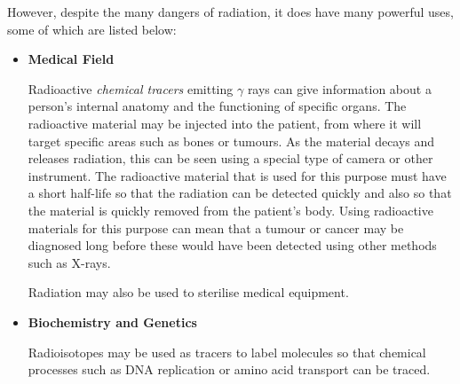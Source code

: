 However, despite the many dangers of radiation, it does have many powerful uses, some of which are listed below:

\begin{itemize}
\item{\textbf{Medical Field}}

Radioactive \textit{chemical tracers} emitting $\gamma$ rays can give information about a person's internal anatomy and the functioning of specific organs. The radioactive material may be injected into the patient, from where it will target specific areas such as bones or tumours. As the material decays and releases radiation, this can be seen using a special type of camera or other instrument. The radioactive material that is used for this purpose must have a short half-life so that the radiation can be detected quickly and also so that the material is quickly removed from the patient's body.
Using radioactive materials for this purpose can mean that a tumour or cancer may be diagnosed long before these would have been detected using other methods such as X-rays. 

Radiation may also be used to sterilise medical equipment.


\item{\textbf{Biochemistry and Genetics}}

Radioisotopes may be used as tracers to label molecules so that chemical processes such as DNA replication or amino acid transport can be traced.


\end{itemize}
